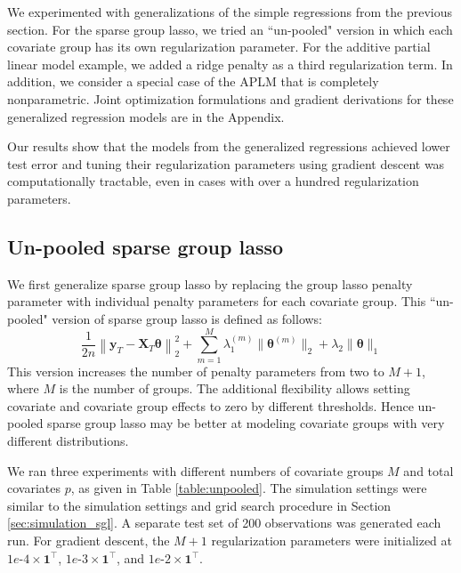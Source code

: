\documentclass{statsoc}
\begin{document}
We experimented with generalizations of the simple regressions from the previous section. For the sparse group lasso, we tried an ``un-pooled" version in which each covariate group has its own regularization parameter. For the additive partial linear model example, we added a ridge penalty as a third regularization term. In addition, we consider a special case of the APLM that is completely nonparametric. Joint optimization formulations and gradient derivations for these generalized regression models are in the Appendix.

Our results show that the models from the generalized regressions achieved lower test error and tuning their regularization parameters using gradient descent was computationally tractable, even in cases with over a hundred regularization parameters.

\subsection{Un-pooled sparse group lasso}

We first generalize sparse group lasso by replacing the group lasso penalty parameter with individual penalty parameters for each covariate group. This ``un-pooled" version of sparse group lasso is defined as follows:
\begin{equation}
\frac{1}{2n} 
\left \| \boldsymbol{y}_T - \boldsymbol{X}_T \boldsymbol{\theta} \right \|^2_2
+ \sum_{m=1}^M \lambda_1^{(m)} \| \boldsymbol \theta^{(m)} \|_2
+ \lambda_2 \| \boldsymbol \theta \|_1
\label{unpooledSGL}
\end{equation}
This version increases the number of penalty parameters from two to $M+1$, where $M$ is the number of groups. The additional flexibility allows setting covariate and covariate group effects to zero by different thresholds. Hence un-pooled sparse group lasso may be better at modeling covariate groups with very different distributions.

We ran three experiments with different numbers of covariate groups $M$ and total covariates $p$, as given in Table \ref{table:unpooled}. The simulation settings were similar to the simulation settings and grid search procedure in Section \ref{sec:simulation_sgl}. A separate test set of 200 observations was generated each run. For gradient descent, the $M+1$ regularization parameters were initialized at $1e\text{-}4 \times \boldsymbol 1^\top$, $1e\text{-}3 \times \boldsymbol 1^\top$, and $1e\text{-}2 \times \boldsymbol 1^\top$.
\end{document}
